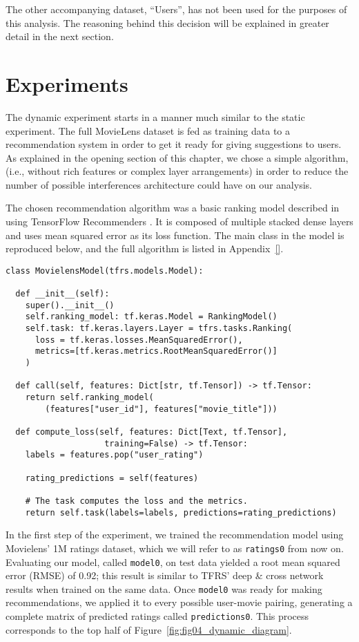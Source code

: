 The other accompanying dataset, ``Users'', has not been used for the purposes of
this analysis. The reasoning behind this decision will be explained in greater
detail in the next section.

\section{Experiments}
\label{sec:experiments04}

The dynamic experiment starts in a manner much similar to the static experiment.
The full MovieLens dataset is fed as training data to a recommendation system in
order to get it ready for giving suggestions to users. As explained in the
opening section of this chapter, we chose a simple algorithm, (i.e., without
rich features or complex layer arrangements) in order to reduce the number of
possible interferences architecture could have on our analysis.

The chosen recommendation algorithm was a basic ranking model described in
\citet{} using TensorFlow Recommenders \citep{}. It is composed of multiple
stacked dense layers and uses mean squared error as its loss function. The main
class in the model is reproduced below, and the full algorithm is listed in
Appendix~\ref{}.


\begin{verbatim}
class MovielensModel(tfrs.models.Model):

  def __init__(self):
    super().__init__()
    self.ranking_model: tf.keras.Model = RankingModel()
    self.task: tf.keras.layers.Layer = tfrs.tasks.Ranking(
      loss = tf.keras.losses.MeanSquaredError(),
      metrics=[tf.keras.metrics.RootMeanSquaredError()]
    )

  def call(self, features: Dict[str, tf.Tensor]) -> tf.Tensor:
    return self.ranking_model(
        (features["user_id"], features["movie_title"]))

  def compute_loss(self, features: Dict[Text, tf.Tensor],
                    training=False) -> tf.Tensor:
    labels = features.pop("user_rating")

    rating_predictions = self(features)

    # The task computes the loss and the metrics.
    return self.task(labels=labels, predictions=rating_predictions)
\end{verbatim}

In the first step of the experiment, we trained the recommendation model using
Movielens' 1M ratings dataset, which we will refer to as \verb|ratings0| from
now on. Evaluating our model, called \verb|model0|, on test data yielded a root
mean squared error (RMSE) of 0.92; this result is similar to TFRS' deep \& cross
network \citep{} results when trained on the same data. Once \verb|model0| was
ready for making recommendations, we applied it to every possible user-movie
pairing, generating a complete matrix of predicted ratings called
\verb|predictions0|. This process corresponds to the top half of
Figure~\ref{fig:fig04_dynamic_diagram}.

